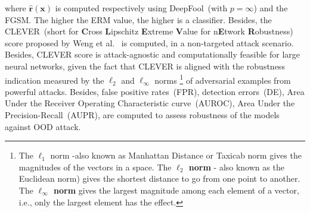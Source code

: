 \hspace*{3.5mm} where $\hat{\boldsymbol{r}}(\boldsymbol{x})$ is computed respectively using DeepFool~(with $p=\infty$) and the FGSM. The higher the ERM value, the higher is a classifier. Besides, the CLEVER~(short for \textbf{C}ross \textbf{L}ipschitz \textbf{E}xtreme \textbf{V}alue for n\textbf{E}twork \textbf{R}obustness) score proposed by Weng et al.~\cite{weng2018evaluating} is computed, in a non-targeted attack scenario. 
Besides, CLEVER score is attack-agnostic and computationally feasible for large neural networks, given the fact that CLEVER is aligned with the robustness indication measured by the $\ell_{2}$ and $\ell_{\infty}$ norms \footnote{The \textbf{$\ell_{1}$} norm -also known as Manhattan Distance or Taxicab norm gives the magnitudes of the vectors in a space. The \textbf{$\ell_{2}$ norm} - also known as the Euclidean norm) gives the shortest distance to go from one point to another. The \textbf{$\ell_{\infty}$ norm} gives the largest magnitude among each element of a vector, i.e., only the largest element has the effect.} of adversarial examples from powerful attacks. 
Besides, false positive rates~(FPR), detection errors~(DE), Area Under the Receiver Operating Characteristic curve~(AUROC), Area Under the Precision-Recall~(AUPR), are computed to assess robustness of the models against OOD attack. 

